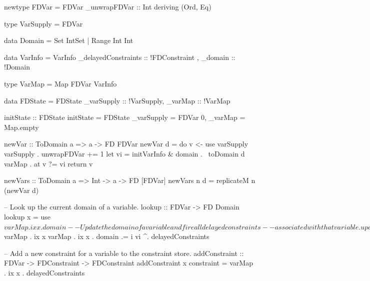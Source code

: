 \documentclass[aspectratio=169,hyphens]{beamer} %
\begin{document}
\begin{frame}[fragile]
\begin{code}
newtype FDVar = FDVar { _unwrapFDVar :: Int } deriving (Ord, Eq)

type VarSupply = FDVar

data Domain
    = Set IntSet
    | Range Int Int

data VarInfo = VarInfo { _delayedConstraints :: !FDConstraint
                       , _domain :: !Domain }

type VarMap = Map FDVar VarInfo

data FDState = FDState { _varSupply :: !VarSupply, _varMap :: !VarMap }

initState :: FDState
initState = FDState { _varSupply = FDVar 0, _varMap = Map.empty }
\end{code}
\end{frame}

\begin{frame}[fragile]
\begin{code}
newVar :: ToDomain a => a -> FD FDVar
newVar d = do
    v <- use varSupply
    varSupply . unwrapFDVar += 1
    let vi = initVarInfo & domain .~ toDomain d
    varMap . at v ?= vi
    return v

newVars :: ToDomain a => Int -> a -> FD [FDVar]
newVars n d = replicateM n (newVar d)
\end{code}
\end{frame}

\begin{frame}[fragile]
\begin{code}
-- Look up the current domain of a variable.
lookup :: FDVar -> FD Domain
lookup x =
    use $ varMap . ix x . domain

-- Update the domain of a variable and fire all delayed constraints
-- associated with that variable.
update :: FDVar -> Domain -> FDConstraint
update x i = do
    vi <- use $ varMap . ix x
    varMap . ix x . domain .= i
    vi ^. delayedConstraints

-- Add a new constraint for a variable to the constraint store.
addConstraint :: FDVar -> FDConstraint -> FDConstraint
addConstraint x constraint =
    varMap . ix x . delayedConstraints %
\end{code}
\end{frame}

\begin{frame}[fragile]
\end{frame}
\end{document}
